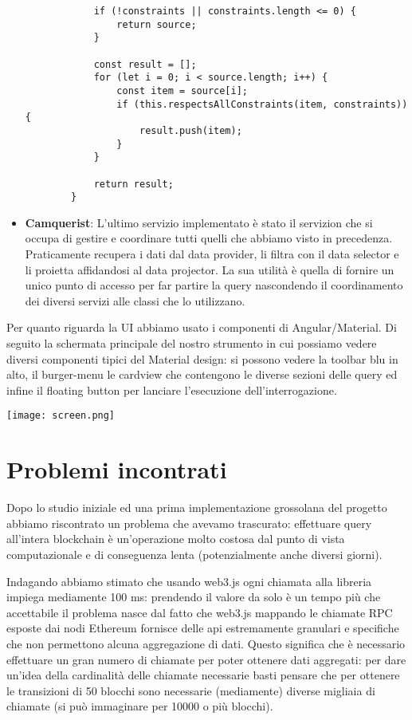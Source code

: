 \begin{itemize}
\begin{lstlisting}
            if (!constraints || constraints.length <= 0) {
                return source;
            }
        
            const result = [];
            for (let i = 0; i < source.length; i++) {
                const item = source[i];
                if (this.respectsAllConstraints(item, constraints)) {
                    result.push(item);
                }
            }
        
            return result;
        }
    \end{lstlisting}

    \item {\bfseries Camquerist}:
    L'ultimo servizio implementato è stato il servizion che si occupa di gestire e coordinare tutti quelli che abbiamo visto in precedenza.
    Praticamente recupera i dati dal data provider, li filtra con il data selector e li proietta affidandosi al data projector.
    La sua utilità è quella di fornire un unico punto di accesso per far partire la query nascondendo il coordinamento dei diversi servizi alle classi che lo utilizzano.

\end{itemize}

Per quanto riguarda la UI abbiamo usato i componenti di Angular/Material.
Di seguito la schermata principale del nostro strumento in cui possiamo vedere diversi componenti tipici del Material design:
si possono vedere la toolbar blu in alto, il burger-menu le cardview che contengono le diverse sezioni delle query ed infine il floating button per lanciare l'esecuzione dell'interrogazione.

\begin{center}
    \texttt{[image: screen.png]}
\end{center}

\section{Problemi incontrati}
Dopo lo studio iniziale ed una prima implementazione grossolana del progetto abbiamo riscontrato un problema che avevamo trascurato:
effettuare query all'intera blockchain è un'operazione molto costosa dal punto di vista computazionale e di conseguenza lenta (potenzialmente anche diversi giorni).

Indagando abbiamo stimato che usando web3.js ogni chiamata alla libreria impiega mediamente 100 ms: 
prendendo il valore da solo è un tempo più che accettabile il problema nasce dal fatto che web3.js mappando le chiamate RPC esposte dai nodi Ethereum
fornisce delle api estremamente granulari e specifiche che non permettono alcuna aggregazione di dati.
Questo significa che è necessario effettuare un gran numero di chiamate per poter ottenere dati aggregati:
per dare un'idea della cardinalità delle chiamate necessarie basti pensare che per ottenere le transizioni di 50 blocchi sono necessarie (mediamente) diverse migliaia di chiamate (si può immaginare per 10000 o più blocchi).

